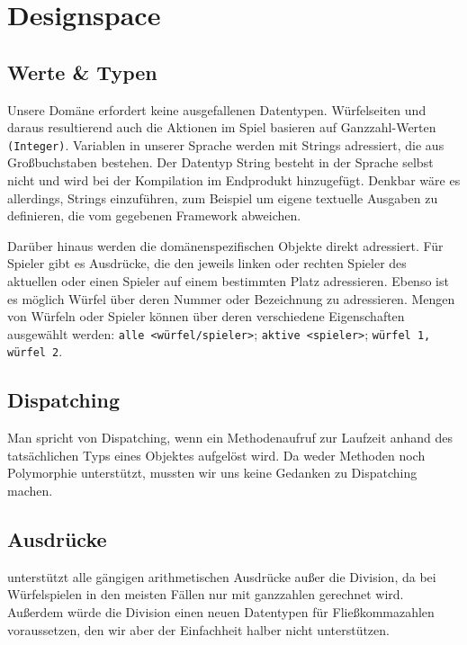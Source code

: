 \section{Designspace} %
\label{sec:designspace}

\subsection{Werte \& Typen} %
\label{sub:werte_typen}
Unsere Domäne erfordert keine ausgefallenen Datentypen. Würfelseiten und daraus resultierend auch die Aktionen im Spiel basieren auf Ganzzahl-Werten \texttt{(Integer)}. Variablen in unserer Sprache werden mit Strings adressiert, die aus Großbuchstaben bestehen. Der Datentyp String besteht in der Sprache selbst nicht und wird bei der Kompilation im Endprodukt hinzugefügt. Denkbar wäre es allerdings, Strings einzuführen, zum Beispiel um eigene textuelle Ausgaben zu definieren, die vom gegebenen Framework abweichen.

Darüber hinaus werden die domänenspezifischen Objekte direkt adressiert. Für Spieler gibt es Ausdrücke, die den jeweils linken oder rechten Spieler des aktuellen oder einen Spieler auf einem bestimmten Platz adressieren. Ebenso ist es möglich Würfel über deren Nummer oder Bezeichnung zu adressieren. Mengen von Würfeln oder Spieler können über deren verschiedene Eigenschaften ausgewählt werden: \texttt{alle <würfel/spieler>}; \texttt{aktive <spieler>}; \texttt{würfel 1, würfel 2}.

\subsection{Dispatching} %
\label{sub:dispatching}
	Man spricht von Dispatching, wenn ein Methodenaufruf zur Laufzeit anhand des tatsächlichen Typs eines Objektes aufgelöst wird. Da \dg weder Methoden noch Polymorphie unterstützt, mussten wir uns keine Gedanken zu Dispatching machen.


\subsection{Ausdrücke} %
\label{sub:ausdrucke}
	\dg unterstützt alle gängigen arithmetischen Ausdrücke außer die Division, da bei Würfelspielen in den meisten Fällen nur mit ganzzahlen gerechnet wird. Außerdem würde die Division einen neuen Datentypen für Fließkommazahlen voraussetzen, den wir aber der Einfachheit halber nicht unterstützen.
	
